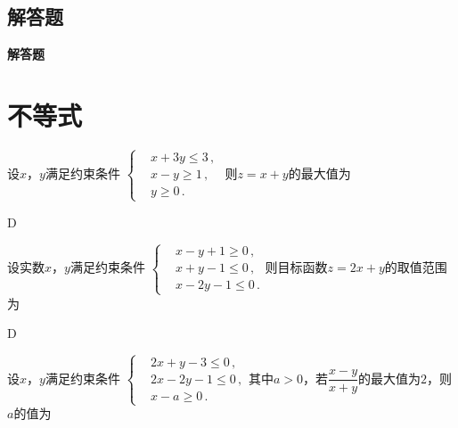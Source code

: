   \subsection{解答题}\begin{exercise}{\bf 解答题}
\section{不等式}
  \begin{exercise}
    \item %
      设$x$，$y$满足约束条件
      $\left\{\begin{aligned}
        &x+3y\leqslant3\,,\\
        &x-y\geqslant1\,,\\
        &y\geqslant0\,.
      \end{aligned}\right.$
      则$z=x+y$的最大值为\xz
      \begin{answer}
        D
      \end{answer}
    \item %
      设实数$x$，$y$满足约束条件
      $\left\{\begin{aligned}
        &x-y+1\geqslant0\,,\\
        &x+y-1\leqslant0\,,\\
        &x-2y-1\leqslant0\,.
      \end{aligned}\right.$则目标函数$z=2x+y$的取值范围为\xz
      \xx{$[1,+\infty)$}{$[2,+\infty)$}{$[-8,1]$}{$[-8,2]$}
      \begin{answer}
        D
      \end{answer}
    \item %
      设$x$，$y$满足约束条件
      $\left\{\begin{aligned}
        &2x+y-3\leqslant0\,,\\
        &2x-2y-1\leqslant0\,,\\
        &x-a\geqslant0\,.
      \end{aligned}\right.$其中$a>0$，若$\dfrac{x-y}{x+y}$的最大值为$2$，则$a$的值为\xz

\end{exercise}
\end{exercise}
